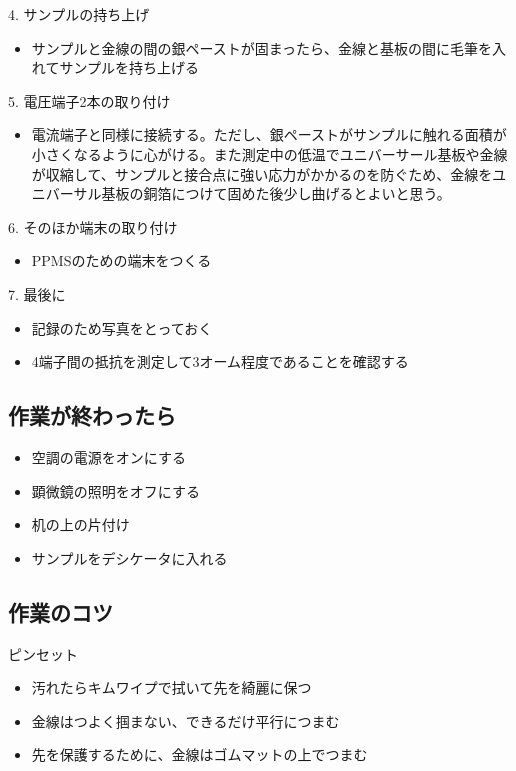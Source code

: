 4. サンプルの持ち上げ
\begin{itemize}
\item サンプルと金線の間の銀ペーストが固まったら、金線と基板の間に毛筆を入れてサンプルを持ち上げる
 \end{itemize}
 
5. 電圧端子2本の取り付け
\begin{itemize}
\item 電流端子と同様に接続する。ただし、銀ペーストがサンプルに触れる面積が小さくなるように心がける。また測定中の低温でユニバーサール基板や金線が収縮して、サンプルと接合点に強い応力がかかるのを防ぐため、金線をユニバーサル基板の銅箔につけて固めた後少し曲げるとよいと思う。
 \end{itemize}
 
6. そのほか端末の取り付け
\begin{itemize}
\item PPMSのための端末をつくる
\end{itemize}

7. 最後に
\begin{itemize}
\item 記録のため写真をとっておく
\item 4端子間の抵抗を測定して3オーム程度であることを確認する
\end{itemize}
 

\subsection{作業が終わったら} 
\begin{itemize}
\item 空調の電源をオンにする
\item 顕微鏡の照明をオフにする
\item 机の上の片付け
\item サンプルをデシケータに入れる
\end{itemize}
 
 \subsection{作業のコツ} 
ピンセット
\begin{itemize}
\item 汚れたらキムワイプで拭いて先を綺麗に保つ
\item 金線はつよく掴まない、できるだけ平行につまむ
\item 先を保護するために、金線はゴムマットの上でつまむ
\end{itemize}
 

